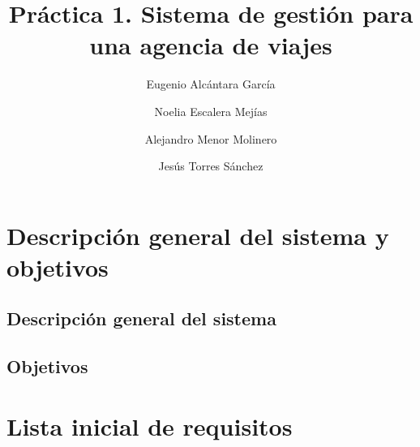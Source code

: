 \documentclass{article}
\title{Práctica 1. Sistema de gestión para una agencia de viajes}
\author{Eugenio Alcántara García\\
		\and Noelia Escalera Mejías\\
		\and Alejandro Menor Molinero\\
		\and Jesús Torres Sánchez}
\begin{document}
	\maketitle
	\section{Descripción general del sistema y objetivos}
	\subsection{Descripción general del sistema}
	\subsection{Objetivos}
	\section{Lista inicial de requisitos}
\end{document}
